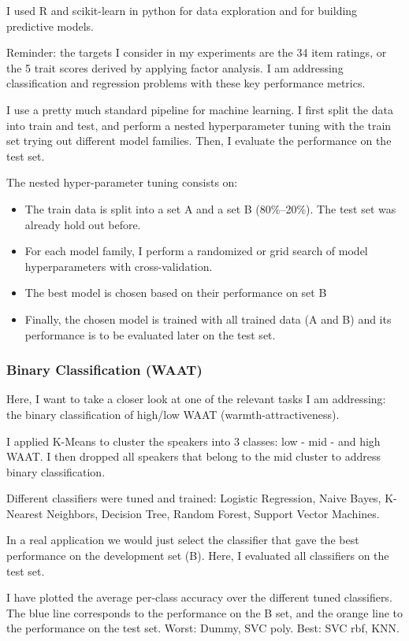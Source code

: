 \documentclass[a4paper]{article}
\begin{document}
I used R and scikit-learn in python for data exploration and for building predictive models.

Reminder: the targets I consider in my experiments are the 34 item ratings, or the 5 trait scores derived by applying factor analysis. I am addressing classification and regression problems with these key performance metrics.

I use a pretty much standard pipeline for machine learning. I first split the data into train and test, and perform a nested hyperparameter tuning with the train set trying out different model families. Then, I evaluate the performance on the test set.

The nested hyper-parameter tuning consists on: 

\begin{itemize}
	\item The train data is split into a set A and a set B (80\%--20\%). The test set was already hold out before.
	\item For each model family, I perform a randomized or grid search of model hyperparameters with cross-validation.
	\item The best model is chosen based on their performance on set B
	\item Finally, the chosen model is trained with all trained data (A and B) and its performance is to be evaluated later on the test set. 
\end{itemize}

\subsubsection{Binary Classification (WAAT)}

Here, I want to take a closer look at one of the relevant tasks I am addressing: the binary classification of high/low WAAT (warmth-attractiveness).

I applied K-Means to cluster the speakers into 3 classes: low - mid - and high WAAT. I then dropped all speakers that belong to the mid cluster to address binary classification.

Different classifiers were tuned and trained: Logistic Regression, Naive Bayes, K-Nearest Neighbors, Decision Tree, Random Forest, Support Vector Machines.

In a real application we would just select the classifier that gave the best performance on the development set (B). Here, I evaluated all classifiers on the test set.

I have plotted the average per-class accuracy over the different tuned classifiers. The blue line corresponds to the performance on the B set, and the orange line to the performance on the test set. Worst: Dummy, SVC poly. Best: SVC rbf, KNN.
\end{document}
